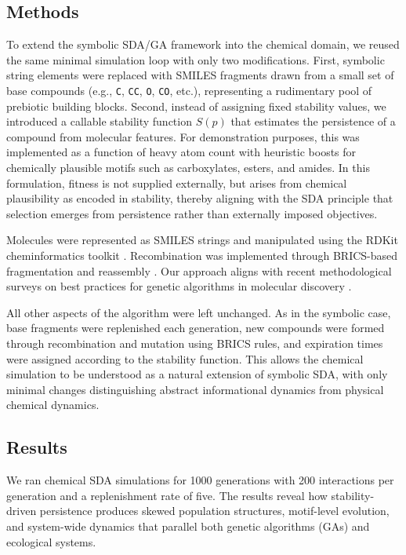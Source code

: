 \documentclass[life,article,submit,pdftex,moreauthors]{Definitions/mdpi}
\begin{document}
\subsection{Methods}

To extend the symbolic SDA/GA framework into the chemical domain, we reused the same minimal simulation loop with only two modifications. First, symbolic string elements were replaced with SMILES fragments drawn from a small set of base compounds (e.g., \texttt{C}, \texttt{CC}, \texttt{O}, \texttt{CO}, etc.), representing a rudimentary pool of prebiotic building blocks. Second, instead of assigning fixed stability values, we introduced a callable stability function $S(p)$ that estimates the persistence of a compound from molecular features. For demonstration purposes, this was implemented as a function of heavy atom count with heuristic boosts for chemically plausible motifs such as carboxylates, esters, and amides. In this formulation, fitness is not supplied externally, but arises from chemical plausibility as encoded in stability, thereby aligning with the SDA principle that selection emerges from persistence rather than externally imposed objectives.  

Molecules were represented as SMILES strings and manipulated using the RDKit cheminformatics toolkit \cite{landrum2006rdkit}. Recombination was implemented through BRICS-based fragmentation and reassembly \cite{degen2008art}. Our approach aligns with recent methodological surveys on best practices for genetic algorithms in molecular discovery \cite{janet2023bestpractices}.

All other aspects of the algorithm were left unchanged. As in the symbolic case, base fragments were replenished each generation, new compounds were formed through recombination and mutation using BRICS rules, and expiration times were assigned according to the stability function. This allows the chemical simulation to be understood as a natural extension of symbolic SDA, with only minimal changes distinguishing abstract informational dynamics from physical chemical dynamics.  

\subsection{Results}

We ran chemical SDA simulations for 1000 generations with 200 interactions per generation and a replenishment rate of five. The results reveal how stability-driven persistence produces skewed population structures, motif-level evolution, and system-wide dynamics that parallel both genetic algorithms (GAs) and ecological systems.  
\end{document}

